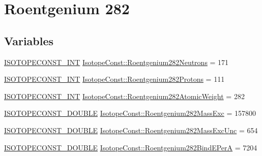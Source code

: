 \hypertarget{group___isotope_const-_roentgenium-_rg282}{}\section{Roentgenium 282}
\label{group___isotope_const-_roentgenium-_rg282}
\subsection*{Variables}
\begin{DoxyCompactItemize}
\item 
\mbox{\hyperlink{group___isotope_const-_macros_ga5f18360b3e99483a35c32d789e62621c}{I\+S\+O\+T\+O\+P\+E\+C\+O\+N\+S\+T\+\_\+\+I\+NT}} \mbox{\hyperlink{group___isotope_const-_roentgenium-_rg282_ga2e24b6236c31893f517e96e1aba336b0}{Isotope\+Const\+::\+Roentgenium282\+Neutrons}} = 171
\item 
\mbox{\hyperlink{group___isotope_const-_macros_ga5f18360b3e99483a35c32d789e62621c}{I\+S\+O\+T\+O\+P\+E\+C\+O\+N\+S\+T\+\_\+\+I\+NT}} \mbox{\hyperlink{group___isotope_const-_roentgenium-_rg282_gab03ac541d3d10ab48d29d9adcd75eb19}{Isotope\+Const\+::\+Roentgenium282\+Protons}} = 111
\item 
\mbox{\hyperlink{group___isotope_const-_macros_ga5f18360b3e99483a35c32d789e62621c}{I\+S\+O\+T\+O\+P\+E\+C\+O\+N\+S\+T\+\_\+\+I\+NT}} \mbox{\hyperlink{group___isotope_const-_roentgenium-_rg282_ga9c63029915f2fc4f9c1048fbcac08c9b}{Isotope\+Const\+::\+Roentgenium282\+Atomic\+Weight}} = 282
\item 
\mbox{\hyperlink{group___isotope_const-_macros_ga8f45a7272ce02c0b4c65c44636ed719a}{I\+S\+O\+T\+O\+P\+E\+C\+O\+N\+S\+T\+\_\+\+D\+O\+U\+B\+LE}} \mbox{\hyperlink{group___isotope_const-_roentgenium-_rg282_ga040203415742ef11805ac484ff36dabd}{Isotope\+Const\+::\+Roentgenium282\+Mass\+Exc}} = 157800
\item 
\mbox{\hyperlink{group___isotope_const-_macros_ga8f45a7272ce02c0b4c65c44636ed719a}{I\+S\+O\+T\+O\+P\+E\+C\+O\+N\+S\+T\+\_\+\+D\+O\+U\+B\+LE}} \mbox{\hyperlink{group___isotope_const-_roentgenium-_rg282_ga269d7ab722f0da7abe1c2f0f718e8d9f}{Isotope\+Const\+::\+Roentgenium282\+Mass\+Exc\+Unc}} = 654
\item 
\mbox{\hyperlink{group___isotope_const-_macros_ga8f45a7272ce02c0b4c65c44636ed719a}{I\+S\+O\+T\+O\+P\+E\+C\+O\+N\+S\+T\+\_\+\+D\+O\+U\+B\+LE}} \mbox{\hyperlink{group___isotope_const-_roentgenium-_rg282_gad52dd72d2adb8f8dfe20b34ef686e364}{Isotope\+Const\+::\+Roentgenium282\+Bind\+E\+PerA}} = 7204

\end{DoxyCompactItemize}
